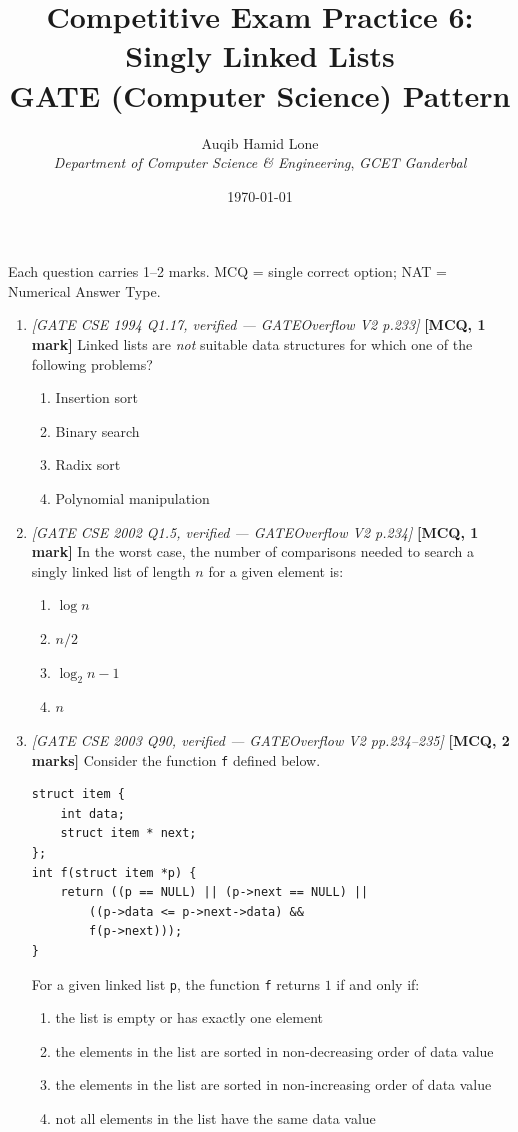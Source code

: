 \documentclass[11pt]{article}
\title{Competitive Exam Practice 6: Singly Linked Lists\\\large GATE (Computer Science) Pattern}
\author{Auqib Hamid Lone\\[0.3em]
  \emph{Department of Computer Science \& Engineering}, \emph{GCET Ganderbal}}
\date{\today}
\begin{document}
\maketitle

\noindent Each question carries 1--2 marks. MCQ = single correct option; NAT = Numerical Answer Type.

\begin{enumerate}
\item[\textbf{Q1}] \textit{[GATE CSE 1994 Q1.17, verified --- GATEOverflow V2 p.233]} \textbf{[MCQ, 1 mark]} Linked lists are \emph{not} suitable data structures for which one of the following problems?
\begin{enumerate}
  \item[(A)] Insertion sort
  \item[(B)] Binary search
  \item[(C)] Radix sort
  \item[(D)] Polynomial manipulation
\end{enumerate}

\item[\textbf{Q2}] \textit{[GATE CSE 2002 Q1.5, verified --- GATEOverflow V2 p.234]} \textbf{[MCQ, 1 mark]} In the worst case, the number of comparisons needed to search a singly linked list of length $n$ for a given element is:
\begin{enumerate}
  \item[(A)] $\log n$
  \item[(B)] $n/2$
  \item[(C)] $\log_2 n - 1$
  \item[(D)] $n$
\end{enumerate}

\item[\textbf{Q3}] \textit{[GATE CSE 2003 Q90, verified --- GATEOverflow V2 pp.234--235]} \textbf{[MCQ, 2 marks]} Consider the function \texttt{f} defined below.
\begin{verbatim}
struct item {
    int data;
    struct item * next;
};
int f(struct item *p) {
    return ((p == NULL) || (p->next == NULL) ||
        ((p->data <= p->next->data) &&
        f(p->next)));
}
\end{verbatim}
For a given linked list \texttt{p}, the function \texttt{f} returns $1$ if and only if:
\begin{enumerate}
  \item[(A)] the list is empty or has exactly one element
  \item[(B)] the elements in the list are sorted in non-decreasing order of data value
  \item[(C)] the elements in the list are sorted in non-increasing order of data value
  \item[(D)] not all elements in the list have the same data value
\end{enumerate}


\end{enumerate}
\end{document}
